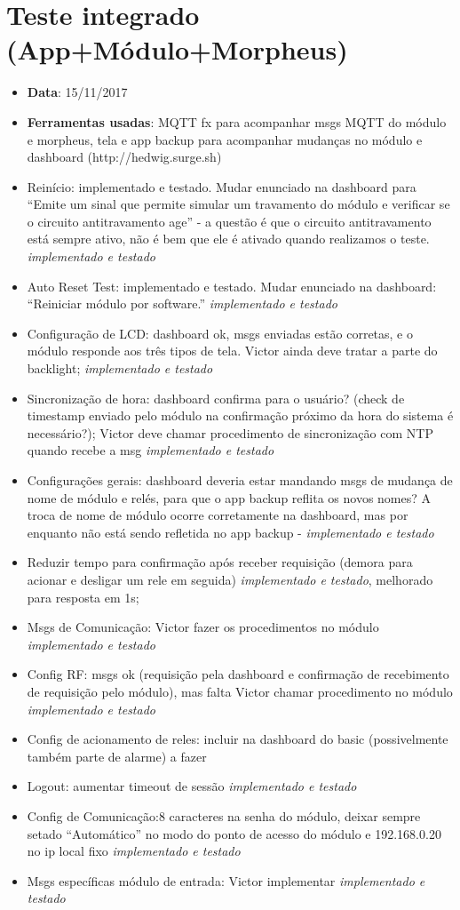 \chapter{Teste integrado (App+Módulo+Morpheus)}
\label{atttestefimafim}

\begin{itemize}
	\item \textbf{Data}: 15/11/2017
	\item \textbf{Ferramentas usadas}: MQTT fx para acompanhar msgs MQTT do módulo e morpheus, tela e app backup para acompanhar mudanças no módulo e dashboard (http://hedwig.surge.sh)
\item Reinício: implementado e testado. Mudar enunciado na dashboard para “Emite um sinal que permite simular um travamento do módulo e verificar se o circuito antitravamento age” - a questão é que o circuito antitravamento está sempre ativo, não é bem que ele é ativado quando realizamos o teste.  \textit{implementado e testado}
\item Auto Reset Test: implementado e testado. Mudar enunciado na dashboard: “Reiniciar módulo por software.”  \textit{implementado e testado}
\item Configuração de LCD: dashboard ok, msgs enviadas estão corretas, e o módulo responde aos três tipos de tela. Victor ainda deve tratar a parte do backlight;  \textit{implementado e testado}
\item Sincronização de hora: dashboard confirma para o usuário? (check de timestamp enviado pelo módulo na confirmação próximo da hora do sistema é necessário?); Victor deve chamar procedimento de sincronização com NTP quando recebe a msg   \textit{implementado e testado}
\item Configurações gerais: dashboard deveria estar mandando msgs de mudança de nome de módulo e relés, para que o app backup reflita os novos nomes? A troca de nome de módulo ocorre corretamente na dashboard, mas por enquanto não está sendo refletida no app backup -  \textit{implementado e testado}
\item Reduzir tempo para confirmação após receber requisição (demora para acionar e desligar um rele em seguida)  \textit{implementado e testado}, melhorado para resposta em 1s;
\item Msgs de Comunicação: Victor fazer os procedimentos no módulo \textit{implementado e testado}
\item Config RF: msgs ok (requisição pela dashboard e confirmação de recebimento de requisição pelo módulo), mas falta Victor chamar procedimento no módulo \textit{implementado e testado}
\item Config de acionamento de reles: incluir na dashboard do basic (possivelmente também parte de alarme) a fazer
\item Logout: aumentar timeout de sessão \textit{implementado e testado}
\item Config de Comunicação:8 caracteres na senha do módulo, deixar sempre setado “Automático” no modo do ponto de acesso do módulo e 192.168.0.20 no ip local fixo \textit{implementado e testado}
\item Msgs específicas módulo de entrada: Victor implementar \textit{implementado e testado}
\end{itemize}
